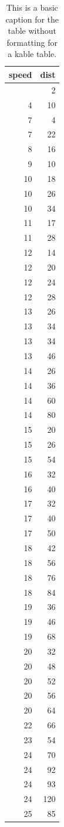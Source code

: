 \documentclass[
  letterpaper,
]{article}
\begin{document}
\endgroup

\begin{longtable}[]{@{}rr@{}}

\caption{\label{tbl-no-format-kbl}This is a basic caption for the table
without formatting for a kable table.}

\tabularnewline

\toprule\noalign{}
speed & dist \\
\midrule\noalign{}
\endhead
\bottomrule\noalign{}
\endlastfoot
4 & 2 \\
4 & 10 \\
7 & 4 \\
7 & 22 \\
8 & 16 \\
9 & 10 \\
10 & 18 \\
10 & 26 \\
10 & 34 \\
11 & 17 \\
11 & 28 \\
12 & 14 \\
12 & 20 \\
12 & 24 \\
12 & 28 \\
13 & 26 \\
13 & 34 \\
13 & 34 \\
13 & 46 \\
14 & 26 \\
14 & 36 \\
14 & 60 \\
14 & 80 \\
15 & 20 \\
15 & 26 \\
15 & 54 \\
16 & 32 \\
16 & 40 \\
17 & 32 \\
17 & 40 \\
17 & 50 \\
18 & 42 \\
18 & 56 \\
18 & 76 \\
18 & 84 \\
19 & 36 \\
19 & 46 \\
19 & 68 \\
20 & 32 \\
20 & 48 \\
20 & 52 \\
20 & 56 \\
20 & 64 \\
22 & 66 \\
23 & 54 \\
24 & 70 \\
24 & 92 \\
24 & 93 \\
24 & 120 \\
25 & 85 \\

\end{longtable}
\end{document}
